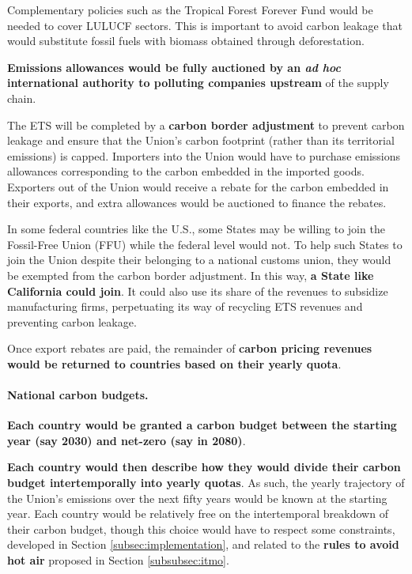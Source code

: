 \documentclass[12pt,english]{article}
\begin{document}
Complementary policies such as the Tropical Forest Forever Fund would be needed to cover LULUCF sectors. This is important to avoid carbon leakage that would substitute fossil fuels with biomass obtained through deforestation.\cite{aggarwal_negative_2025} %

\textbf{Emissions allowances would be fully auctioned by an \textit{ad hoc} international authority to polluting companies upstream} of the supply chain. 

The ETS will be completed by a \textbf{carbon border adjustment} to prevent carbon leakage and ensure that the Union's carbon footprint (rather than its territorial emissions) is capped. Importers into the Union would have to purchase emissions allowances corresponding to the carbon embedded in the imported goods. Exporters out of the Union would receive a rebate for the carbon embedded in their exports, and extra allowances would be auctioned to finance the rebates. 

In some federal countries like the U.S., some States may be willing to join the Fossil-Free Union (FFU) while the federal level would not. To help such States to join the Union despite their belonging to a national customs union, they would be exempted from the carbon border adjustment. In this way, \textbf{a State like California could join}. It could also use its share of the revenues to subsidize manufacturing firms, perpetuating its way of recycling ETS revenues and preventing carbon leakage.

Once export rebates are paid, the remainder of \textbf{carbon pricing revenues would be returned to countries based on their yearly quota}.

\paragraph{National carbon budgets.}
\textbf{Each country would be granted a carbon budget between the starting year (say 2030) and net-zero (say in 2080)}. 

\textbf{Each country would then describe how they would divide their carbon budget intertemporally into yearly quotas}. As such, the yearly trajectory of the Union's emissions over the next fifty years would be known at the starting year. Each country would be relatively free on the intertemporal breakdown of their carbon budget, though this choice would have to respect some constraints, developed in Section \ref{subsec:implementation}, and related to the \textbf{rules to avoid hot air} proposed in Section \ref{subsubsec:itmo}.
\end{document}
